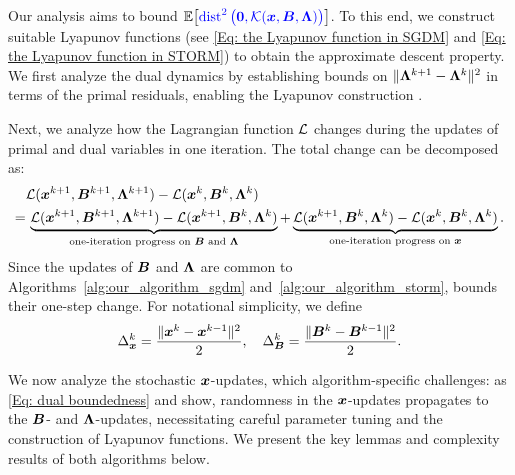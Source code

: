 Our analysis aims to bound $\mathbb{E}\big[{\color{blue}\operatorname{dist}^{2}\big(\bm{0},\mathcal{K}(\bm{x},\bm{B},\bm{\Lambda})\big)}\big]$. 
To this end, we construct suitable Lyapunov functions (see \eqref{Eq: the Lyapunov function in SGDM} and \eqref{Eq: the Lyapunov function in STORM}) to obtain the approximate descent property. We first analyze the dual dynamics by establishing bounds on $\|\bm{\Lambda}^{k+1}-\bm{\Lambda}^k\|^2$ in terms of the primal residuals, enabling the Lyapunov construction .

Next, we analyze how the Lagrangian function $\mathcal{L}$ changes
during the updates of primal and dual variables in one iteration. The total change can be decomposed as:
\begin{align}
    \label{Eq: One-iteration progress decomposition} & \calL(\bx^{k+1}, \bB^{k+1}, \bLmbd^{k+1}) - \calL(\bx^{k}, \bB^{k}, \bLmbd^{k}) \notag                                                                                                                                                                                       \\
    =                                                & \,\underbrace{\calL(\bx^{k+1}, \bB^{k+1}, \bLmbd^{k+1}) - \calL(\bx^{k+1}, \bB^k, \bLmbd^k)}_{\text{one-iteration progress on $\bB$ and $\bLmbd$}}+ \underbrace{\calL(\bx^{k+1}, \bB^{k}, \bLmbd^{k}) - \calL(\bx^{k}, \bB^k, \bLmbd^k)}_{\text{one-iteration progress on $\bx$}}.
\end{align}
Since the updates of $\bm{B}$ and $\bm{\Lambda}$ are common to Algorithms~\ref{alg:our_algorithm_sgdm} and~\ref{alg:our_algorithm_storm},  bounds their one-step change. For notational simplicity, we define
\[
    \Delta_{\bm{x}}^{k}= \frac{\|\bm{x}^{k}- \bm{x}^{k-1}\|^{2}}{2},\quad \Delta_{\bm{B}}^{k}
    = \frac{\|\bm{B}^{k}- \bm{B}^{k-1}\|^{2}}{2}.
\]

We now analyze the stochastic $\bm{x}$-updates, which  algorithm-specific challenges:
as \eqref{Eq: dual boundedness} and \blue{\eqref{item: B and Lambda}} show, randomness in the $\bm{x}$-updates propagates to the $\bm{B}$- and $\bm{\Lambda}$-updates, necessitating careful parameter tuning and the construction of Lyapunov functions. We present the key lemmas and complexity results of both algorithms below.
